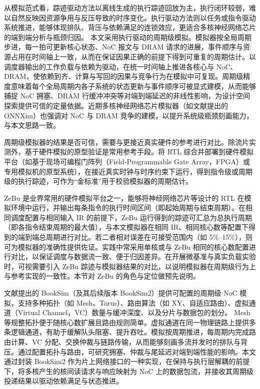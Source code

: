 
从模拟范式看，踪迹驱动方法以离线生成的执行踪迹回放为主，执行闭环较弱，难以自然反映因资源争用与反压导致的时序变化。执行驱动方法则以任务或指令驱动系统推进，能够体现排队、背压与依赖满足的连锁效应，更适合多核神经网络芯片的端到端分析与瓶颈归因\cite{zhang2023gem5nvdla}。 本文采用执行驱动的周期级模拟。模拟器按全局周期步进，每一拍可更新核心状态、NoC 报文与 DRAM 请求的进展，事件顺序与资源占用在时间轴上一致，从而在保证因果正确的前提下得到可重复的周期估计。以调度器输出的工作负载与依赖为驱动，在统一时间轴上推进各核心与 NoC、DRAM，使依赖到齐、计算与写回的因果与竞争行为在模拟中可复现。周期级精度意味着每个全局周期内各子系统的状态更新与事件顺序可被显式建模，从而能够捕捉 NoC 拥塞、DRAM 行缓冲冲突等对端到端延迟的非线性影响，为设计空间探索提供可信的定量依据。近期多核神经网络芯片模拟器（如文献\parencite{jin2024onnxim}提出的 ONNXim）也强调对 NoC 与 DRAM 竞争的建模，以提升系统级瓶颈刻画能力，与本文思路一致。


周期级模拟器的结果是否可信，需要与更接近真实硬件的参考进行对比。除流片实测外，基于硬件模拟的原型验证是常用参考手段。将 RTL 综合并部署到硬件模拟平台（如基于现场可编程门阵列（Field-Programmable Gate Array，FPGA）或专用模拟机的原型系统），在接近真实时钟与时序约束下运行，得到指令级或周期级的执行踪迹，可作为“金标准”用于校验模拟器的周期估计。

ZeBu 是业界常用的硬件模拟平台之一，能够将神经网络芯片等设计的 RTL 在模拟环境中运行，并输出每条指令的执行时间区间（即起始周期与结束周期）。在相同调度配置与相同输入 IR 的前提下，ZeBu 运行得到的踪迹可汇总为总执行周期（即各指令结束周期的最大值），与本文模拟器在相同 IR、相同核心数等配置下得到的端到端总周期进行对比。若二者相对误差在可接受范围内（如 5\%--15\%），则可为模拟器的准确性提供佐证。实践中常采用单核或与 ZeBu 相同的核心数配置进行对比，以保证调度与数据流一致、便于归因差异。在开展微基准与真实负载实验时，可视需要引入 ZeBu 踪迹与模拟器结果的对比，以说明模拟器在周期级行为上与参考实现的一致性。本节对 ZeBu 的角色与定位做预先说明。



文献\parencite{jiang2013booksim}提出的 BookSim（及其后续版本 BookSim2）提供可配置的周期级 NoC 模拟，支持多种拓扑（如 Mesh、Torus）、路由算法（如 XY、自适应路由）、虚拟通道（Virtual Channel，VC）数量与缓冲深度、以及分片与数据包的划分。 Mesh 等规整拓扑便于随核心数扩展且路由规则简单。虚拟通道在同一物理链路上提供多条逻辑通道，有助于缓解队头阻塞、提升吞吐。模拟按周期推进，每周期内完成路由计算、VC 分配、交换仲裁与链路传输，从而能够刻画多流并发时的排队与背压。通过配置拓扑与路由，可研究拥塞、仲裁与尾延迟对端到端性能的影响。本文通过封装 BookSim2 作为片上网络接口的一种实现，在保持与执行层解耦的前提下，将多核产生的核间读请求与响应映射为 NoC 上的数据包流，并接收其周期级投递结果以驱动依赖满足与状态推进。

